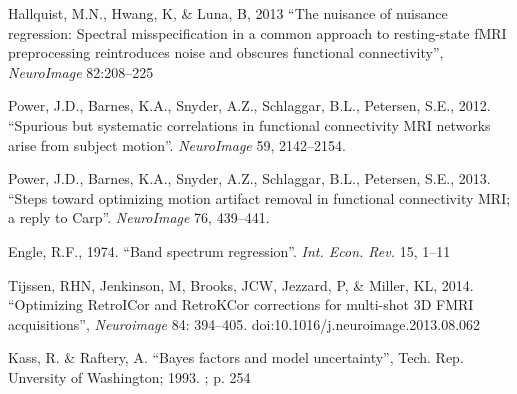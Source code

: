 \documentclass[twoside,twocolumn]{article}
\begin{document}
\begin{thebibliography}{99}
     Hallquist, M.N., Hwang, K, \& Luna, B, 2013 ``The nuisance of nuisance regression: Spectral misspeciﬁcation in a common approach to resting-state fMRI preprocessing reintroduces noise and obscures functional connectivity'', {\em NeuroImage} 82:208–225
    
      Power, J.D., Barnes, K.A., Snyder, A.Z., Schlaggar, B.L., Petersen, S.E., 2012. ``Spurious but systematic correlations in functional connectivity MRI networks arise from subject motion''. {\em NeuroImage} 59, 2142–2154. 
    
     Power, J.D., Barnes, K.A., Snyder, A.Z., Schlaggar, B.L., Petersen, S.E., 2013. ``Steps toward optimizing motion artifact removal in functional connectivity MRI; a reply to Carp''. {\em NeuroImage} 76, 439–441.
    
     Engle, R.F., 1974. ``Band spectrum regression''. {\em Int. Econ. Rev.} 15, 1–11
    
     Tijssen, RHN, Jenkinson, M,  Brooks, JCW, Jezzard, P, \& Miller, KL, 2014. ``Optimizing RetroICor and RetroKCor corrections for multi-shot 3D FMRI acquisitions'', {\em Neuroimage} 84: 394–405. doi:10.1016/j.neuroimage.2013.08.062
    
     Kass, R. \& Raftery, A. ``Bayes factors and model uncertainty'', Tech. Rep. Unversity of Washington; 1993. ; p. 254
    
\end{thebibliography}

\end{document}
